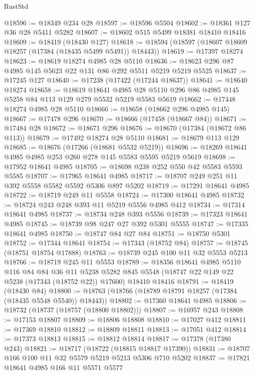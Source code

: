 \begin{lexlean}{RustStd}
\begin{coremodule}
@18596 := @18349 @234 @28
@18597 := @18596 @5504
@18602 := @18361 @127 @36 @28 @5411 @5282
@18607 := @18602 @515 @5499 @18381 @18410 @18416
@18609 := @18419 (@18430 @127)
@18618 := @18594 (@18597 (@18607 @18609 @18257 (@17384 (@18435 @5499 @5491)) @18443))
@18619 := @17397 @18274
@18623 := @18619 @18274 @4985 @28 @5110
@18636 := @18623 @296 @87 @4985 @145 @5623 @22 @131 @86 @292 @5511 @5219 @5219 @5525
@18637 := @17245 @127
@18640 := @17238 (@17422 (@17244 @18637))
@18641 := @18640 @18274
@18658 := @18619
    @18641
    @4985
    @28
    @5110
    @296
    @86
    @4985
    @145
    @5258
    @84
    @113
    @129
    @279
    @5532
    @5219
    @5583
    @5619
@18662 := @17448 @18274 @4985 @28 @5110
@18666 := @18658 (@18662 @296 @4985 @145)
@18667 := @17478 @296
@18670 := @18666 (@17458 (@18667 @84))
@18671 := @17484 @28
@18672 := @18671 @296
@18676 := @18670 (@17384 (@18672 @86 @113))
@18679 := @17492 @18274 @28 @5110
@18681 := @18679 @113 @129
@18685 := @18676 (@17266 (@18681 @5532 @5219))
@18696 := @18269 @18641 @4985 @4985 @253 @260 @278 @145 @5583 @5595 @5219 @5619
@18698 := @17952 @18641 @4985
@18705 := @18698 @238 @252 @550 @42 @5583 @5593 @5585
@18707 := @17965 @18641 @4985
@18717 := @18707 @249 @251 @11 @392 @5558 @5582 @5592 @5306 @897 @5202
@18719 := @17291 @18641 @4985
@18722 := @18719 @249 @11 @5558
@18724 := @17300 @18641 @4985
@18732 := @18724 @243 @248 @393 @11 @5219 @5556 @4985 @412
@18734 := @17314 @18641 @4985
@18737 := @18734 @248 @393 @5556
@18739 := @17323 @18641 @4985
@18745 := @18739 @98 @247 @27 @392 @5301 @5555
@18747 := @17335 @18641 @4985
@18750 := @18747 @84 @27 @84
@18751 := @18750 @5301
@18752 := @17344 @18641
@18754 := @17343 (@18752 @84)
@18757 := @18745 (@18751 @18754 @17888)
@18763 := @18739 @245 @100 @11 @32 @5553 @5213
@18766 := @18719 @245 @11 @5553
@18789 := @18356
    @18641
    @4985
    @5110
    @116
    @84
    @84
    @36
    @11
    @5238
    @5282
    @845
    @5548
    (@18747 @22 @149 @22 @5238 (@17343 (@18752 @22)) @17600)
    @18410
    @18416
@18791 := @18419 (@18430 @84)
@18800 := @18763 (@18766 (@18789 @18791 @18257 (@17384 (@18435 @5548 @5540)) @18443))
@18802 := @17360 @18641 @4985
@18806 := @18732 (@18737 (@18757 (@18800 @18802)))
@18807 := @16957 @243
@18808 := @17153 @18807
@18809 := @18806 @18808
@18810 := @17027 @412
@18811 := @17369 @18810
@18812 := @18809 @18811
@18813 := @17051 @412
@18814 := @17373 @18813
@18815 := @18812 @18814
@18817 := @17378 (@17380 @243)
@18821 := @18717 (@18722 (@18815 @18817 @17390))
@18831 := @18707 @166 @100 @11 @32 @5579 @5219 @5213 @5306 @710 @5202
@18837 := @17821 @18641 @4985 @166 @11 @5571 @5577

\end{coremodule}
\end{lexlean}
